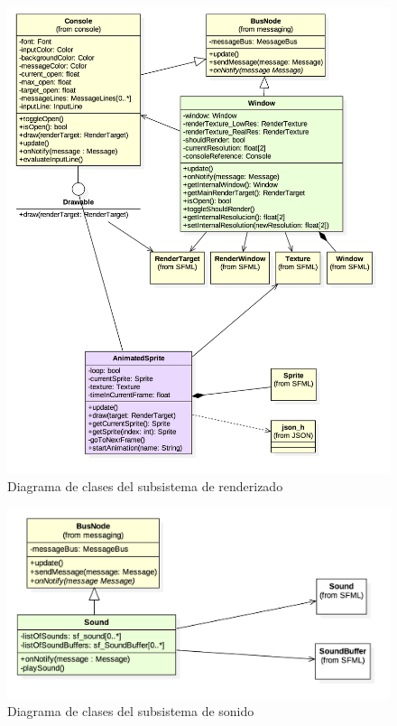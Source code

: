 \begin{figure}
	\centerline{\includegraphics[width=15cm]{otros/UML/png/alld/png/rendering__diagramaDeClases_rendering_9.png}}
	\caption{Diagrama de clases del subsistema de renderizado}
	\label{class:rendering}
\end{figure}


\begin{figure}
	\centerline{\includegraphics[width=15cm]{otros/UML/png/alld/png/sound__diagramaDeClases_sound_1.png}}
	\caption{Diagrama de clases del subsistema de sonido}
	\label{class:sound}
\end{figure}

